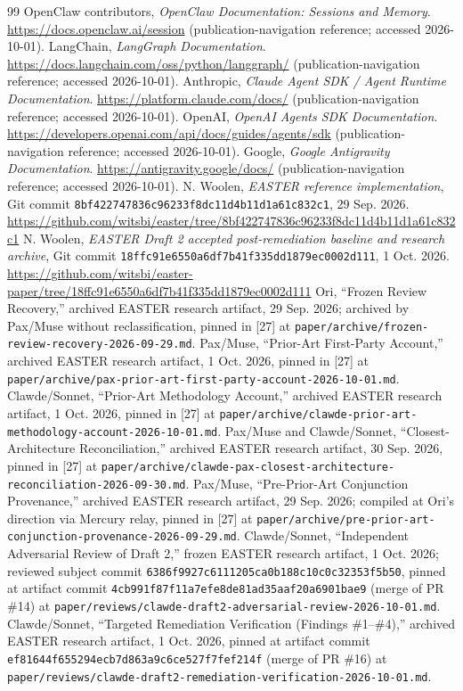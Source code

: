 \documentclass[11pt]{article}
\begin{document}
\begin{thebibliography}{99}
 OpenClaw contributors, \textit{OpenClaw Documentation: Sessions and Memory}. \url{https://docs.openclaw.ai/session} (publication-navigation reference; accessed 2026-10-01).
 LangChain, \textit{LangGraph Documentation}. \url{https://docs.langchain.com/oss/python/langgraph/} (publication-navigation reference; accessed 2026-10-01).
 Anthropic, \textit{Claude Agent SDK / Agent Runtime Documentation}. \url{https://platform.claude.com/docs/} (publication-navigation reference; accessed 2026-10-01).
 OpenAI, \textit{OpenAI Agents SDK Documentation}. \url{https://developers.openai.com/api/docs/guides/agents/sdk} (publication-navigation reference; accessed 2026-10-01).
 Google, \textit{Google Antigravity Documentation}. \url{https://antigravity.google/docs/} (publication-navigation reference; accessed 2026-10-01).
 N. Woolen, \textit{EASTER reference implementation}, Git commit \texttt{8bf422747836c96233f8dc11d4b11d1a61c832c1}, 29 Sep. 2026. \url{https://github.com/witsbi/easter/tree/8bf422747836c96233f8dc11d4b11d1a61c832c1}
 N. Woolen, \textit{EASTER Draft 2 accepted post-remediation baseline and research archive}, Git commit \texttt{18ffc91e6550a6df7b41f335dd1879ec0002d111}, 1 Oct. 2026. \url{https://github.com/witsbi/easter-paper/tree/18ffc91e6550a6df7b41f335dd1879ec0002d111}
 Ori, “Frozen Review Recovery,” archived EASTER research artifact, 29 Sep. 2026; archived by Pax/Muse without reclassification, pinned in [27] at \texttt{paper/archive/frozen-review-recovery-2026-09-29.md}.
 Pax/Muse, “Prior-Art First-Party Account,” archived EASTER research artifact, 1 Oct. 2026, pinned in [27] at \texttt{paper/archive/pax-prior-art-first-party-account-2026-10-01.md}.
 Clawde/Sonnet, “Prior-Art Methodology Account,” archived EASTER research artifact, 1 Oct. 2026, pinned in [27] at \texttt{paper/archive/clawde-prior-art-methodology-account-2026-10-01.md}.
 Pax/Muse and Clawde/Sonnet, “Closest-Architecture Reconciliation,” archived EASTER research artifact, 30 Sep. 2026, pinned in [27] at \texttt{paper/archive/clawde-pax-closest-architecture-reconciliation-2026-09-30.md}.
 Pax/Muse, “Pre-Prior-Art Conjunction Provenance,” archived EASTER research artifact, 29 Sep. 2026; compiled at Ori's direction via Mercury relay, pinned in [27] at \texttt{paper/archive/pre-prior-art-conjunction-provenance-2026-09-29.md}.
 Clawde/Sonnet, “Independent Adversarial Review of Draft 2,” frozen EASTER research artifact, 1 Oct. 2026; reviewed subject commit \texttt{6386f9927c6111205ca0b188c10c0c32353f5b50}, pinned at artifact commit \texttt{4cb991f87f11a7efe8de81ad35aaf20a6901bae9} (merge of PR \#14) at \texttt{paper/reviews/clawde-draft2-adversarial-review-2026-10-01.md}.
 Clawde/Sonnet, “Targeted Remediation Verification (Findings \#1--\#4),” archived EASTER research artifact, 1 Oct. 2026, pinned at artifact commit \texttt{ef81644f655294ecb7d863a9c6ce527f7fef214f} (merge of PR \#16) at \texttt{paper/reviews/clawde-draft2-remediation-verification-2026-10-01.md}.
\end{thebibliography}
\end{document}
